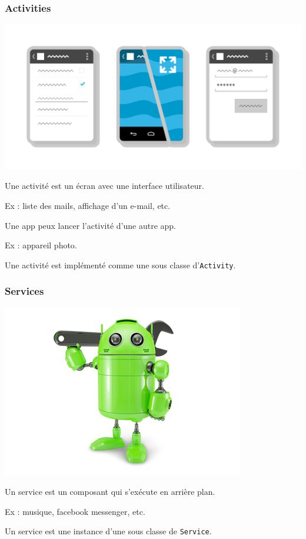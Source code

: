 \documentclass{beamer}
\begin{document}
\begin{frame}
\frametitle{Activities}

\begin{center}
\includegraphics[scale=0.1]{c-activity.png}
\end{center}

\begin{block}{}
Une activité est un écran avec une interface utilisateur.

Ex : liste des mails, affichage d'un e-mail, etc.
\end{block}
\begin{block}{}
Une app peux lancer l'activité d'une autre app.

Ex : appareil photo.
\end{block}

\begin{block}{}
Une activité est implémenté comme une sous classe d'\verb!Activity!.
\end{block}
\end{frame}

\begin{frame}
\frametitle{Services}

\begin{center}
\includegraphics[scale=0.8]{c-services.png}
\end{center}


\begin{block}{}
Un service est un composant qui s’exécute en arrière plan.

Ex : musique, facebook messenger, etc.
\end{block}

\begin{block}{}
Un service est une instance d'une sous classe de \verb!Service!.
\end{block}
\end{frame}
\end{document}
